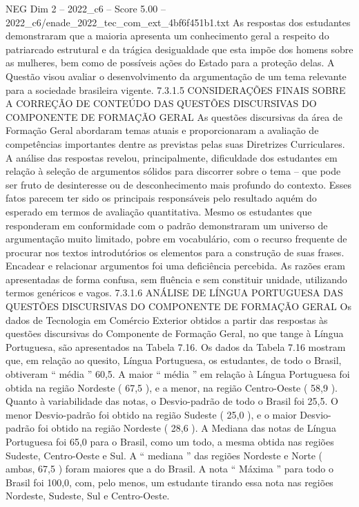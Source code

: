 \begin{textsample}{NEG Dim 2 – 2022\_c6 – Score 5.00 – 2022\_c6/enade\_2022\_tec\_com\_ext\_4bf6f451b1.txt}
As respostas dos estudantes demonstraram que a maioria apresenta um conhecimento geral a respeito do patriarcado estrutural e da trágica desigualdade que esta impõe dos homens sobre as mulheres, bem como de possíveis ações do Estado para a proteção delas.
A Questão visou avaliar o desenvolvimento da argumentação de um tema relevante para a sociedade brasileira vigente. 7.3.1.5 CONSIDERAÇÕES FINAIS SOBRE A CORREÇÃO DE CONTEÚDO DAS QUESTÕES DISCURSIVAS DO COMPONENTE DE FORMAÇÃO GERAL As questões discursivas da área de Formação Geral abordaram temas atuais e proporcionaram a avaliação de competências importantes dentre as previstas pelas suas Diretrizes Curriculares.
A análise das respostas revelou, principalmente, dificuldade dos estudantes em relação à seleção de argumentos sólidos para discorrer sobre o tema – que pode ser fruto de desinteresse ou de desconhecimento mais profundo do contexto.
Esses fatos parecem ter sido os principais responsáveis pelo resultado aquém do esperado em termos de avaliação quantitativa.
Mesmo os estudantes que responderam em conformidade com o padrão demonstraram um universo de argumentação muito limitado, pobre em vocabulário, com o recurso frequente de procurar nos textos introdutórios os elementos para a construção de suas frases.
Encadear e relacionar argumentos foi uma deficiência percebida.
As razões eram apresentadas de forma confusa, sem fluência e sem constituir unidade, utilizando termos genéricos e vagos. 7.3.1.6 ANÁLISE DE LÍNGUA PORTUGUESA DAS QUESTÕES DISCURSIVAS DO COMPONENTE DE FORMAÇÃO GERAL Os dados de Tecnologia em Comércio Exterior obtidos a partir das respostas às questões discursivas do Componente de Formação Geral, no que tange à Língua Portuguesa, são apresentados na Tabela 7.16.
Os dados da Tabela 7.16 mostram que, em relação ao quesito, Língua Portuguesa, os estudantes, de todo o Brasil, obtiveram “ média ” 60,5.
A maior “ média ” em relação à Língua Portuguesa foi obtida na região Nordeste ( 67,5 ), e a menor, na região Centro-Oeste ( 58,9 ).
Quanto à variabilidade das notas, o Desvio-padrão de todo o Brasil foi 25,5.
O menor Desvio-padrão foi obtido na região Sudeste ( 25,0 ), e o maior Desvio-padrão foi obtido na região Nordeste ( 28,6 ).
A Mediana das notas de Língua Portuguesa foi 65,0 para o Brasil, como um todo, a mesma obtida nas regiões Sudeste, Centro-Oeste e Sul.
A “ mediana ” das regiões Nordeste e Norte ( ambas, 67,5 ) foram maiores que a do Brasil.
A nota “ Máxima ” para todo o Brasil foi 100,0, com, pelo menos, um estudante tirando essa nota nas regiões Nordeste, Sudeste, Sul e Centro-Oeste.

\end{textsample}
